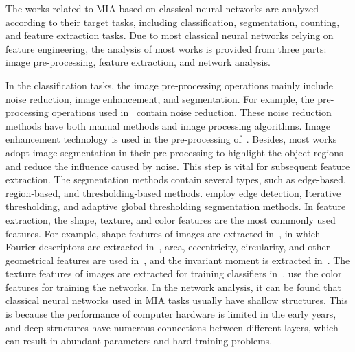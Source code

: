 The works related to MIA based on classical neural networks are analyzed according to their target tasks, including classification, segmentation, counting, and feature extraction tasks. Due to most classical neural networks relying on feature engineering, the analysis of most works is provided from three parts: image pre-processing, feature extraction, and network analysis.




In the classification tasks, the image pre-processing operations mainly include noise reduction, image enhancement, and segmentation. For example, the pre-processing operations used in~\cite{Culverhouse-1994-ACFS,Ginoris-2007-RPMU,Mosleh-2012-APSA} contain noise reduction. These noise reduction methods have both manual methods and image processing algorithms. Image enhancement technology is used in the pre-processing of~\cite{Danping-2013-IPMS}. Besides, most works adopt image segmentation in their pre-processing to highlight the object regions and reduce the influence caused by noise. This step is vital for subsequent feature extraction. The segmentation methods contain several types, such as edge-based, region-based, and thresholding-based methods. \cite{Blackburn-1998-RDBA,Weller-2005-SCSO,Xiaojuan-2007-ANBC,Hiremath-2010-AICB} employ edge detection, Iterative thresholding, and adaptive global thresholding segmentation methods. In feature extraction, the shape, texture, and color features are the most commonly used features. For example, shape features of images are extracted in~\cite{Veropoulos-1998-IPNC,Gerlach-1998-IRSM,Hu-2006-AAQT,Xiaojuan-2007-ANBR}, in which Fourier descriptors are extracted in~\cite{Veropoulos-1998-IPNC,Hu-2006-AAQT}, area, eccentricity, circularity, and other geometrical features are used in~\cite{Gerlach-1998-IRSM}, and the invariant moment is extracted in~\cite{Hu-2006-AAQT,Xiaojuan-2007-ANBR}. The texture features of images are extracted for training classifiers in~\cite{Culverhouse-1996-ACFD,Hu-2006-AAQT,Xiaojuan-2007-ANBR,Mosleh-2012-APSA}. \cite{Balfoort-1992-AIAN,Weller-2005-SCSO,Weller-2007-TSNN} use the color features for training the networks. In the network analysis, it can be found that classical neural networks used in MIA tasks usually have shallow structures. This is because the performance of computer hardware is limited in the early years, and deep structures have numerous connections between different layers, which can result in abundant parameters and hard training problems.




